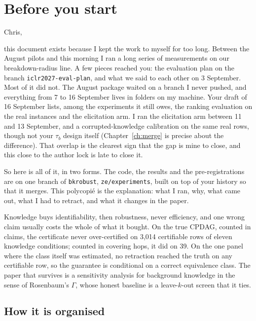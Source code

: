 \chapter*{Before you start}

Chris,

this document exists because I kept the work to myself for too long. Between the August pilots and
this morning I ran a long series of measurements on our breakdown-radius line. A few pieces reached
you: the evaluation plan on the branch \texttt{iclr2027-eval-plan}, and what we said to each other on
3 September. Most of it did not. The August package waited on a branch I never pushed, and
everything from 7 to 16 September lives in folders on my machine. Your draft of 16 September lists,
among the experiments it still owes, the ranking evaluation on the real instances and the elicitation
arm. I ran the elicitation arm between 11 and 13 September, and a corrupted-knowledge calibration on
the same real rows, though not your $\tau_b$ design itself (Chapter~\ref{ch:merge} is precise about
the difference). That overlap is the clearest sign that the gap is mine to close, and this close to the
author lock is late to close it.

So here is all of it, in two forms. The code, the results and the pre-registrations are on one
branch of \texttt{bkrobust}, \texttt{ze/experiments}, built on top of your history so that it merges.
This polycopié is the explanation: what I ran, why, what came out, what I had to retract, and what it
changes in the paper.

\begin{ideia}
Knowledge buys identifiability, then robustness, never efficiency, and one wrong claim usually costs
the whole of what it bought. On the true CPDAG, counted in claims, the certificate never
over-certified on 3,014 certifiable rows of eleven knowledge conditions; counted in covering hops, it
did on 39. On the one panel where the class itself was estimated, no retraction reached the truth on
any certifiable row, so the guarantee is conditional on a correct equivalence class. The
paper that survives is a sensitivity analysis for background knowledge in the sense of Rosenbaum's
$\Gamma$, whose honest baseline is a leave-$k$-out screen that it ties.
\end{ideia}

\section*{How it is organised}

